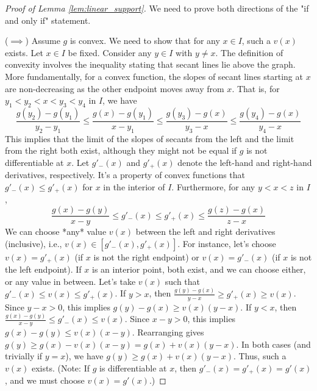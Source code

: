 \documentclass[11pt]{article}
\theoremstyle{definition}
\theoremstyle{remark}
\begin{document}
\begin{proof}[Proof of Lemma \ref{lem:linear_support}]
We need to prove both directions of the "if and only if" statement.

($\implies$) Assume $g$ is convex. We need to show that for any $x \in I$, such a $v(x)$ exists.
Let $x \in I$ be fixed. Consider any $y \in I$ with $y \neq x$. The definition of convexity involves the inequality stating that secant lines lie above the graph. More fundamentally, for a convex function, the slopes of secant lines starting at $x$ are non-decreasing as the other endpoint moves away from $x$. That is, for $y_1 < y_2 < x < y_3 < y_4$ in $I$, we have
\[ \frac{g(y_2)-g(y_1)}{y_2-y_1} \le \frac{g(x)-g(y_1)}{x-y_1} \le \frac{g(y_3)-g(x)}{y_3-x} \le \frac{g(y_4)-g(x)}{y_4-x} \]
This implies that the limit of the slopes of secants from the left and the limit from the right both exist, although they might not be equal if $g$ is not differentiable at $x$. Let $g'_-(x)$ and $g'_+(x)$ denote the left-hand and right-hand derivatives, respectively. It's a property of convex functions that $g'_-(x) \le g'_+(x)$ for $x$ in the interior of $I$. Furthermore, for any $y < x < z$ in $I$,
\[ \frac{g(x)-g(y)}{x-y} \le g'_-(x) \le g'_+(x) \le \frac{g(z)-g(x)}{z-x} \]
We can choose *any* value $v(x)$ between the left and right derivatives (inclusive), i.e., $v(x) \in [g'_-(x), g'_+(x)]$. For instance, let's choose $v(x) = g'_+(x)$ (if $x$ is not the right endpoint) or $v(x) = g'_-(x)$ (if $x$ is not the left endpoint). If $x$ is an interior point, both exist, and we can choose either, or any value in between.
Let's take $v(x)$ such that $g'_-(x) \le v(x) \le g'_+(x)$.
If $y > x$, then $\frac{g(y)-g(x)}{y-x} \ge g'_+(x) \ge v(x)$. Since $y-x > 0$, this implies $g(y)-g(x) \ge v(x)(y-x)$.
If $y < x$, then $\frac{g(x)-g(y)}{x-y} \le g'_-(x) \le v(x)$. Since $x-y > 0$, this implies $g(x)-g(y) \le v(x)(x-y)$. Rearranging gives $g(y) \ge g(x) - v(x)(x-y) = g(x) + v(x)(y-x)$.
In both cases (and trivially if $y=x$), we have $g(y) \ge g(x) + v(x)(y-x)$. Thus, such a $v(x)$ exists.
(Note: If $g$ is differentiable at $x$, then $g'_-(x) = g'_+(x) = g'(x)$, and we must choose $v(x) = g'(x)$.)


\end{proof}
\end{document}
